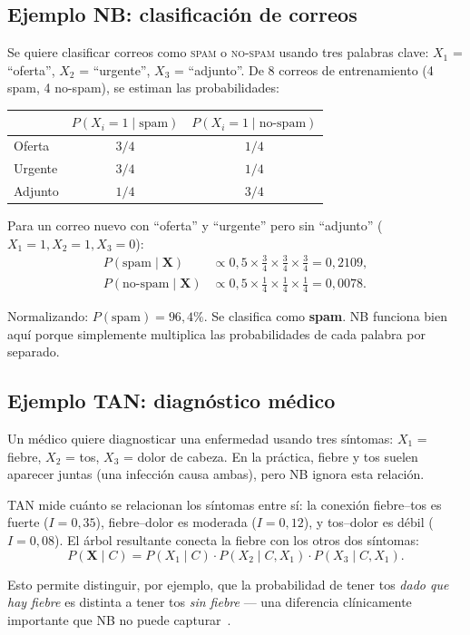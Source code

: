 \subsection{Ejemplo NB: clasificación de correos}

Se quiere clasificar correos como \textsc{spam} o \textsc{no-spam} usando tres palabras clave: $X_1$ = ``oferta'', $X_2$ = ``urgente'', $X_3$ = ``adjunto''. De 8 correos de entrenamiento (4 spam, 4 no-spam), se estiman las probabilidades:

\begin{center}\small
\begin{tabular}{lcc}
    \toprule
    & $P(X_i{=}1 \mid \text{spam})$ & $P(X_i{=}1 \mid \text{no-spam})$ \\
    \midrule
    Oferta  & $3/4$ & $1/4$ \\
    Urgente & $3/4$ & $1/4$ \\
    Adjunto & $1/4$ & $3/4$ \\
    \bottomrule
\end{tabular}
\end{center}

Para un correo nuevo con ``oferta'' y ``urgente'' pero sin ``adjunto'' ($X_1{=}1, X_2{=}1, X_3{=}0$):
\begin{align*}
    P(\text{spam} \mid \mathbf{X}) &\propto 0{,}5 \times \tfrac{3}{4} \times \tfrac{3}{4} \times \tfrac{3}{4} = 0{,}2109, \\
    P(\text{no-spam} \mid \mathbf{X}) &\propto 0{,}5 \times \tfrac{1}{4} \times \tfrac{1}{4} \times \tfrac{1}{4} = 0{,}0078.
\end{align*}

Normalizando: $P(\text{spam}) = 96{,}4\%$. Se clasifica como \textbf{spam}. NB funciona bien aquí porque simplemente multiplica las probabilidades de cada palabra por separado.

\subsection{Ejemplo TAN: diagnóstico médico}

Un médico quiere diagnosticar una enfermedad usando tres síntomas: $X_1$ = fiebre, $X_2$ = tos, $X_3$ = dolor de cabeza. En la práctica, fiebre y tos suelen aparecer juntas (una infección causa ambas), pero NB ignora esta relación.

TAN mide cuánto se relacionan los síntomas entre sí: la conexión fiebre--tos es fuerte ($I = 0{,}35$), fiebre--dolor es moderada ($I = 0{,}12$), y tos--dolor es débil ($I = 0{,}08$). El árbol resultante conecta la fiebre con los otros dos síntomas:
\[
    P(\mathbf{X} \mid C) = P(X_1 \mid C) \cdot P(X_2 \mid C, X_1) \cdot P(X_3 \mid C, X_1).
\]

Esto permite distinguir, por ejemplo, que la probabilidad de tener tos \emph{dado que hay fiebre} es distinta a tener tos \emph{sin fiebre} --- una diferencia clínicamente importante que NB no puede capturar~\cite{friedman1997bayesian}.
